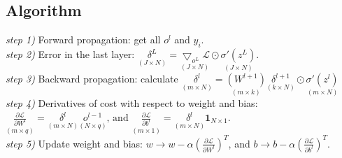 \documentclass[letterpaper,12pt]{article}
\begin{document}
\subsection{Algorithm}
\textit{step 1)} Forward propagation: get all $o^l$ and $\hat{y}_i$.
~\\
\textit{step 2)} Error in the last layer: $\underset{(J\times N)}{\delta^L} =\underset{(J\times N)}{ \bigtriangledown_{o^L}\mathcal{L}}\odot \underset{(J\times N)}{\sigma'(z^L)}$.
~\\
\textit{step 3)} Backward propagation: calculate $\underset{(m\times N)}{\delta^l } = \underset{(m\times k)}{\left(W^{l+1}\right)} \underset{(k\times N)}{\delta^{l+1}}  \odot \underset{(m\times N)}{\sigma'(z^l)}$
~\\
\textit{step 4)} Derivatives of cost with respect to weight and bias:  $\underset{(m\times q)}{\frac{\partial \mathcal{L}}{\partial W^l}} =  \underset{(m\times N)}{\delta^l } \underset{(N\times q)}{o^{l-1}}\text{, and } \underset{(m\times 1)}{\frac{\partial \mathcal{L}}{\partial b^l}} = \underset{(m\times N)}{\delta^l }\boldsymbol{1}_{N\times 1}$.
~\\
\textit{step 5)} Update weight and bias: $w\to w-\alpha \left(\frac{\partial \mathcal{L}}{\partial W^l}\right)^T$, and $b\to b-\alpha\left(\frac{\partial \mathcal{L}}{\partial b^l}\right)^T$.



\clearpage


\end{document}

